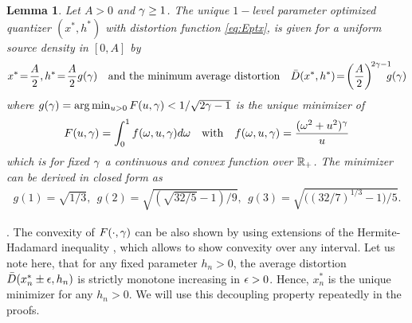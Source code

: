 \documentclass[12pt,onecolumn,final,letterpaper]{IEEEtran}
\newtheorem{lemma}{Lemma}
\newif\ifarxiv\arxivfalse
\newenvironment{remark}{\par\vspace{1.5ex}\noindent{\em Remark\/}.}{\par\vspace{1.5ex}}
\newcommand{\Dis}{\ensuremath{D}}                    %
\newcommand{\AvDis}{\ensuremath{\bar{\Dis}}}         %
\begin{document}
\begin{lemma}\label{lem:ggam}
  Let $A>0$ and $\gamma\geq 1$. The unique $1-$level parameter optimized quantizer $(x^*,h^*)$ with distortion
  function \eqref{eq:Eptx}, is given  for a uniform source
  density in $[0,A]$ by
  \begin{align}
    x^*\!=\!\frac{A}{2},   h^*\!=\!\frac{A}{2} g(\gam) \quad\text{and the minimum average distortion} \quad
    \AvDis(x^*,h^*)\!=\!\left(\frac{A}{2}\right)^{\!2\gam-1}\!\!\!\!g(\gam)\notag
  \end{align}
  where  $g(\gamma)=\arg\min_{u>0} F(u,\gamma)<1/\sqrt{2\gamma-1}$ is the unique minimizer of 
  \begin{align}
    F(u,\gamma)=\int_0^1  f(\omega,u,\gamma) d\omega \quad\text{with}\quad f(\omega,u,\gamma)=\frac{(\omega^2+u^2)^{\gamma}}{u} 
  \end{align}
  which is for fixed $\gamma$ a continuous and convex function over ${\mathbb R}_+$. The minimizer can be derived in closed form as 
  \begin{align}
    g(1) = \sqrt{1/3},\ \  g(2) = \sqrt{ (\sqrt{32/5}-1)/9}, 
    \ \  g(3) = \sqrt{\Big((32/7)^{1/3}-1\Big)/5}.\label{eq:ggam}
  \end{align}
\end{lemma}
%
\ifarxiv 
\begin{proof}
See \appref{app:proof_lemma_ggam}.
\end{proof}
\fi


\begin{remark}
  The convexity of $F(\cdot,\gamma)$ can be also shown by using extensions of the Hermite-Hadamard inequality \cite{ZC10},
  which allows to show convexity over any interval.
  Let us note here, that for any fixed parameter $h_n>0$, the average distortion $\AvDis(x_n^*\pm \eps,h_n)$ is strictly
  monotone increasing in $\epsilon>0$. Hence, $x_n^*$ is the unique minimizer for any $h_n>0$. We will use this decoupling
  property repeatedly in the proofs. 
\end{remark}
\end{document}
